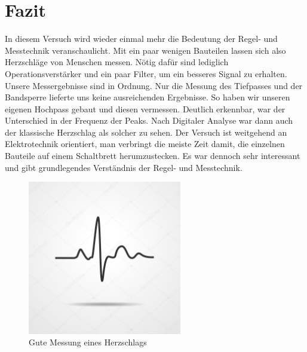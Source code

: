 \chapter{Fazit}

In diesem Versuch wird wieder einmal mehr die Bedeutung der Regel- und Messtechnik veranschaulicht. 
Mit ein paar wenigen Bauteilen lassen sich also Herzschläge von Menschen messen. 
Nötig dafür sind lediglich Operationsverstärker und ein paar Filter, um ein besseres Signal zu erhalten. 
Unsere Messergebnisse sind in Ordnung. 
Nur die Messung des Tiefpasses und der Bandsperre lieferte uns keine ausreichenden Ergebnisse. 
So haben wir unseren eigenen Hochpass gebaut und diesen vermessen. 
Deutlich erkennbar, war der Unterschied in der Frequenz der Peaks. 
Nach Digitaler Analyse war dann auch der klassische Herzschlag als solcher zu sehen. 
Der Versuch ist weitgehend an Elektrotechnik orientiert, man verbringt die meiste Zeit damit,
die einzelnen Bauteile auf einem Schaltbrett herumzustecken. 
Es war dennoch sehr interessant und gibt grundlegendes Verständnis der Regel- und Messtechnik.\\
\begin{figure}[H]
	\centering
	\includegraphics[width=0.6\textwidth]{Abb/herzschlag.jpg}
	\caption{Gute Messung eines Herzschlags}
\end{figure}
